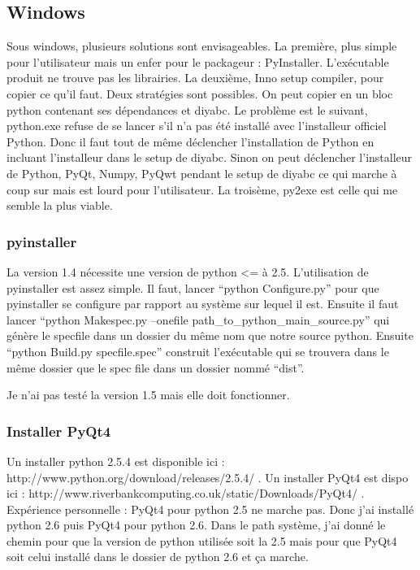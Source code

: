 \documentclass[12pt,a4paper]{article}
\begin{document}
    \subsection{Windows}
        Sous windows, plusieurs solutions sont envisageables. La première, plus simple pour l'utilisateur mais un enfer pour le
        packageur : PyInstaller. L'ex\'ecutable produit ne trouve pas les librairies. 
        La deuxième, Inno setup compiler, pour copier ce qu'il faut. Deux strat\'egies sont possibles. On peut copier en un bloc
        python contenant ses d\'ependances et diyabc. Le problème est le suivant, python.exe refuse de se lancer s'il n'a pas \'et\'e
        install\'e avec l'installeur officiel Python. Donc il faut tout de même d\'eclencher l'installation de Python en incluant
        l'installeur dans le setup de diyabc. Sinon on peut d\'eclencher l'installeur de Python, PyQt, Numpy, PyQwt pendant le setup de
        diyabc ce qui marche à coup sur mais est lourd pour l'utilisateur.
        La troisème, py2exe est celle qui me semble la plus viable.
        \subsubsection{pyinstaller}
        La version 1.4 nécessite une version de python <= à 2.5. L'utilisation de pyinstaller est assez simple. Il faut, 
        lancer ``python Configure.py'' pour que pyinstaller se configure par rapport au système sur lequel il est. Ensuite il faut
        lancer ``python Makespec.py --onefile path\_to\_python\_main\_source.py'' qui génère le specfile dans un dossier du même nom que
        notre source python. Ensuite ``python Build.py specfile.spec'' construit l'exécutable qui se trouvera dans le même dossier que le spec file
        dans un dossier nommé ``dist''.

        Je n'ai pas testé la version 1.5 mais elle doit fonctionner.

        \subsubsection{Installer PyQt4}
        Un installer python 2.5.4 est disponible ici : http://www.python.org/download/releases/2.5.4/ . 
        Un installer PyQt4 est dispo ici : http://www.riverbankcomputing.co.uk/static/Downloads/PyQt4/ .
        Expérience personnelle : PyQt4 pour python 2.5 ne marche pas. Donc j'ai installé python 2.6 puis 
        PyQt4 pour python 2.6. Dans le path système, j'ai donné le chemin pour que la version de python utilisée
        soit la 2.5 mais pour que PyQt4 soit celui installé dans le dossier de python 2.6 et ça marche.
\end{document}
